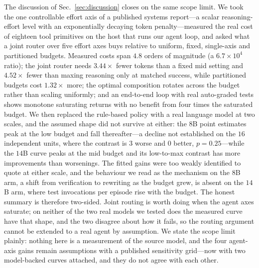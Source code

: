 \documentclass[10pt]{article} %
\begin{document}
The discussion of Sec.~\ref{sec:discussion} closes on the same scope limit. We took the one controllable effort axis of a published systems report---a scalar
reasoning-effort level with an exponentially decaying token penalty---measured the
real cost of eighteen tool primitives on the host that runs our agent loop, and
asked what a joint router over five effort axes buys relative to uniform, fixed,
single-axis and partitioned budgets. Measured costs span $4.8$ orders of
magnitude (a $6.7\times10^{4}$ ratio); the joint router needs $3.44\times$ fewer tokens than a fixed mid
setting and $4.52\times$ fewer than maxing reasoning only at matched success,
while partitioned budgets cost $1.32\times$ more; the optimal composition rotates
across the budget rather than scaling uniformly; and an end-to-end loop with real
auto-graded tests shows monotone saturating returns with no benefit from four
times the saturated budget. We then replaced the rule-based policy with a real
language model at two scales, and the assumed shape did not survive at either: the
$8$B point estimates peak at the low budget and fall thereafter---a decline not
established on the $16$ independent units, where the contrast is $3$ worse and $0$
better, $p{=}0.25$---while the $14$B curve peaks at the mid budget and its low-to-max
contrast has more improvements than worsenings. The fitted gains were too weakly
identified to quote at either scale, and the behaviour we read as the mechanism on the
$8$B arm, a shift from verification to rewriting as the budget grew, is absent on the
$14$B arm, where test invocations per episode rise with the budget.
The honest summary is therefore two-sided. Joint routing is worth doing when the
agent axes saturate; on neither of the two real models we tested does the measured curve
have that shape, and the two disagree about how it fails, so the routing argument cannot
be extended to a real agent by assumption. We state the scope limit plainly: nothing here is
a measurement of the source model, and the four agent-axis gains remain assumptions
with a published sensitivity grid---now with two model-backed curves attached, and they
do not agree with each other.
\end{document}
